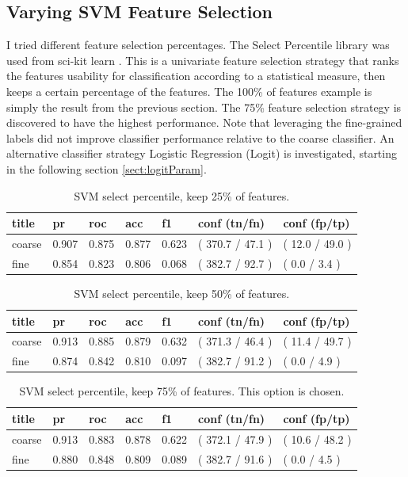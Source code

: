 \documentclass[ms]{nuthesis}
\begin{document}
\subsection{Varying SVM Feature Selection}
\par I tried different feature selection percentages. The Select Percentile library was used from
sci-kit learn \cite{scikit-learn}. This is a univariate feature selection strategy that ranks the
features usability for classification according to a statistical measure, then keeps a certain
percentage of the features. The 100\% of features example is simply the result from the previous
section. The 75\% feature selection strategy is discovered to have the highest performance. Note
that leveraging the fine-grained labels did not improve classifier performance
relative to the coarse classifier. An alternative classifier strategy Logistic Regression
 (Logit) is investigated, starting in the following section \ref{sect:logitParam}.

\FloatBarrier
\begin{table}[H]
\centering
\caption{SVM select percentile, keep 25\% of features.}
\label{tab:SVMSel25}
\begin{tabular}{|l||l||l||l||l||l||l|}\toprule
title & pr & roc & acc & f1 & conf (tn/fn) & conf (fp/tp) \\ \midrule
coarse & 0.907 & 0.875 & 0.877 & 0.623 & ( 370.7 / 47.1 ) & ( 12.0 / 49.0 ) \\
fine & 0.854 & 0.823 & 0.806 & 0.068 & ( 382.7 / 92.7 ) & ( 0.0 / 3.4 ) \\ \bottomrule
\end{tabular}
\end{table}
\FloatBarrier


\FloatBarrier
\begin{table}[H]
\centering
\caption{SVM select percentile, keep 50\% of features.}
\label{tab:SVMSel50}
\begin{tabular}{|l||l||l||l||l||l||l|}\toprule
title & pr & roc & acc & f1 & conf (tn/fn) & conf (fp/tp) \\ \midrule
coarse & 0.913 & 0.885 & 0.879 & 0.632 & ( 371.3 / 46.4 ) & ( 11.4 / 49.7 ) \\
fine & 0.874 & 0.842 & 0.810 & 0.097 & ( 382.7 / 91.2 ) & ( 0.0 / 4.9 ) \\ \bottomrule
\end{tabular}
\end{table}
\FloatBarrier



\FloatBarrier
\begin{table}[H]
\centering
\caption{SVM select percentile, keep 75\% of features. This option is chosen.}
\label{tab:SVMSel75}
\begin{tabular}{|l||l||l||l||l||l||l|}\toprule
title & pr & roc & acc & f1 & conf (tn/fn) & conf (fp/tp) \\ \midrule
coarse & 0.913 & 0.883 & 0.878 & 0.622 & ( 372.1 / 47.9 ) & ( 10.6 / 48.2 ) \\
fine & 0.880 & 0.848 & 0.809 & 0.089 & ( 382.7 / 91.6 ) & ( 0.0 / 4.5 ) \\ \bottomrule
\end{tabular}
\end{table}
\FloatBarrier
\end{document}
